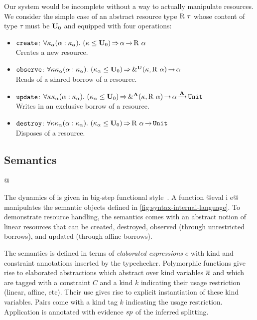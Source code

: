 Our system would be incomplete without a way to actually manipulate resources.
We consider the simple case of an abstract resource
type $\mathrm{R}\ \tau$ whose content of type $\tau$ must be $\mathbf{U}_0$ and
equipped with four operations:
\begin{itemize}
\item 
$\mathtt{create}$:
$\forall{\kvar_\tvar}\bvar{\tvar}{\kvar_\tvar}.\ 
\qual{\Cleq \kvar {\kun_0}}
{\tvar \tarr{} \tapp\tres\tvar}$\\
Creates a new resource.

\item
$\mathtt{observe}$:
$\forall{\kvar\kvar_\tvar}\bvar{\tvar}{\kvar_\tvar}.\ 
\qual{\Cleq {\kvar_\tvar} {\kun_0}}
{\borrowty[\IBORROW]{\kvar}{\tapp\tres\tvar} \tarr{} \tvar}$\\
Reads of a shared borrow of a resource.

\item
$\mathtt{update}$:
$\forall{\kvar\kvar_\tvar}\bvar{\tvar}{\kvar_\tvar}.\ 
\qual{\Cleq {\kvar_\tvar} {\kun_0}}
\borrowty[\MBORROW]{\kvar}{\tapp\tres\tvar} \tarr{} \tvar \tarr{\kaff} \tunit$\\
Writes in an exclusive borrow of a resource.

\item
$\mathtt{destroy}$:
$\forall{\kvar\kvar_\tvar}\bvar{\tvar}{\kvar_\tvar}.\ 
\qual{\Cleq {\kvar_\tvar} {\kun_0}}
\tapp\tres\tvar \tarr{} \tunit$\\
Disposes of a resource.
\end{itemize}

\subsection{Semantics}
\label{sec:sem}


\lstMakeShortInline[style=rule,basicstyle=\normalsize\normalfont]@

The dynamics of \lang is given in big-step
functional
style~\cite{siek13:_type_safet_three_easy_lemmas,DBLP:conf/esop/OwensMKT16,
  DBLP:conf/popl/AminR17}.  A function
@eval \Store \Perm \VEnv i e@
manipulates the semantic objects defined in
\cref{fig:syntax-internal-language}.
To demonstrate resource handling, the semantics comes with an abstract
notion of linear resources that can be created, destroyed, observed
(through unrestricted borrows), and
updated (through affine borrows).

The semantics is defined in terms of \emph{elaborated expressions} $e$
with kind and constraint annotations inserted by the typechecker.
Polymorphic functions give rise to elaborated
abstractions which abstract over kind variables $\overline{\kappa_{{}}}$ and
which are tagged with a constraint $C$ and a kind $k$ indicating their
usage restriction (linear, affine, etc). Their use
gives rise to explicit instantiation of these kind variables. Pairs
come with a kind tag $k$ indicating the usage restriction. Application
is annotated with evidence $sp$ of the inferred splitting. 

